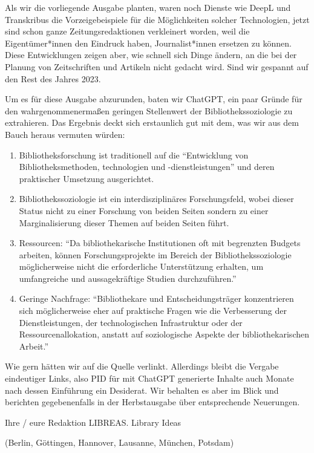 \documentclass[a4paper,
fontsize=11pt,
oneside,
numbers=noperiodatend,
parskip=half-,
bibliography=totoc,
final
]{scrartcl}
\begin{document}
Als wir die vorliegende Ausgabe planten, waren noch Dienste wie DeepL
und Transkribus die Vorzeigebeispiele für die Möglichkeiten solcher
Technologien, jetzt sind schon ganze Zeitungsredaktionen verkleinert
worden, weil die Eigentümer*innen den Eindruck haben, Journalist*innen
ersetzen zu können. Diese Entwicklungen zeigen aber, wie schnell sich
Dinge ändern, an die bei der Planung von Zeitschriften und Artikeln
nicht gedacht wird. Sind wir gespannt auf den Rest des Jahres 2023.

Um es für diese Ausgabe abzurunden, baten wir ChatGPT, ein paar Gründe
für den wahrgenommenermaßen geringen Stellenwert der
Bibliothekssoziologie zu extrahieren. Das Ergebnis deckt sich
erstaunlich gut mit dem, was wir aus dem Bauch heraus vermuten würden:

\begin{enumerate}
\def\labelenumi{\arabic{enumi}.}
\item
  Bibliotheksforschung ist traditionell auf die \enquote{Entwicklung von
   Bibliotheksmethoden, technologien und
  -dienstleistungen} und  deren praktischer Umsetzung
  ausgerichtet.
\item
  Bibliothekssoziologie ist ein interdisziplinäres Forschungsfeld,
   wobei dieser Status nicht zu einer Forschung von beiden
  Seiten  sondern zu einer Marginalisierung dieser Themen
  auf beiden Seiten  führt.
\item
  Ressourcen: \enquote{Da bibliothekarische Institutionen oft mit
  begrenzten  Budgets arbeiten, können Forschungsprojekte
  im Bereich der  Bibliothekssoziologie möglicherweise
  nicht die erforderliche  Unterstützung erhalten, um
  umfangreiche und aussagekräftige  Studien
  durchzuführen.}
\item
  Geringe Nachfrage: \enquote{Bibliothekare und Entscheidungsträger
   konzentrieren sich möglicherweise eher auf praktische
  Fragen wie  die Verbesserung der Dienstleistungen, der
  technologischen  Infrastruktur oder der
  Ressourcenallokation, anstatt auf  soziologische Aspekte
  der bibliothekarischen Arbeit.}
\end{enumerate}

Wie gern hätten wir auf die Quelle verlinkt. Allerdings bleibt die
Vergabe eindeutiger Links, also PID für mit ChatGPT generierte Inhalte
auch Monate nach dessen Einführung ein Desiderat. Wir behalten es aber
im Blick und berichten gegebenenfalls in der Herbstausgabe über
entsprechende Neuerungen.

Ihre / eure Redaktion LIBREAS. Library Ideas

(Berlin, Göttingen, Hannover, Lausanne, München, Potsdam)

\end{document}

